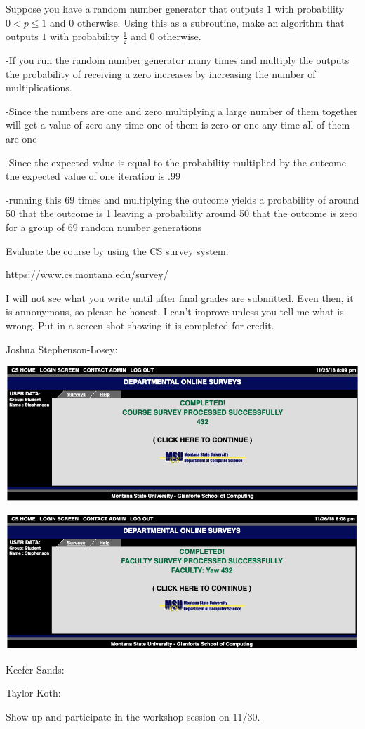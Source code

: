 \documentclass[12pt]{article}
\newenvironment{problem}[2][Problem]
{\begin{trivlist}
\item[\hskip \labelsep {\bfseries #1}\hskip \labelsep {\bfseries #2.}]}{\end{trivlist}}
\begin{document}
\begin{problem}{2}
Suppose you have a random number generator that outputs $1$ with probability $0 < p \le 1$ and $0$ otherwise. Using this as a subroutine, make an algorithm that outputs $1$ with probability $\frac{1}{2}$ and $0$ otherwise.

-If you run the random number generator many times and multiply the outputs the probability of receiving a zero increases by increasing the number of multiplications.

-Since the numbers are one and zero multiplying a large number of them together will get a value of zero any time one of them is zero or one any time all of them are one

-Since the expected value is equal to the probability multiplied by the outcome the expected value of one iteration is .99

-running this 69 times and multiplying the outcome yields a probability of around 50 that the outcome is 1 leaving a probability around 50 that the outcome is zero for a group of 69 random number generations

\end{problem}

\begin{problem}{3*}
Evaluate the course by using the CS survey system: 

https://www.cs.montana.edu/survey/

I will not see what you write until after final grades are submitted. Even then, it is annonymous, so please be honest. I can't improve unless you tell me what is wrong. Put in a screen shot showing it is completed for credit.

Joshua Stephenson-Losey:

\includegraphics[scale = .33]{Surveys/SL_432.png}

\includegraphics[scale = .33]{Surveys/SL_432_yaw.png}

Keefer Sands:

Taylor Koth:


\end{problem}

\begin{problem}{4}
Show up and participate in the workshop session on 11/30.
\end{problem}
 
\end{document}
